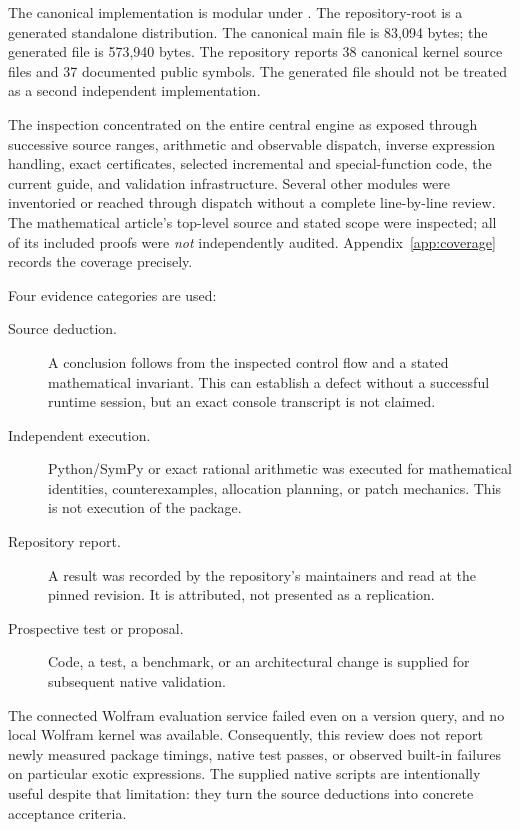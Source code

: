 The canonical implementation is modular under . The repository-root  is a generated standalone distribution. The canonical main file is 83,094 bytes; the generated file is 573,940 bytes. The repository reports 38 canonical kernel source files and 37 documented public symbols. The generated file should not be treated as a second independent implementation.\cite{tree,development,validation}

The inspection concentrated on the entire central engine as exposed through successive source ranges, arithmetic and observable dispatch, inverse expression handling, exact certificates, selected incremental and special-function code, the current guide, and validation infrastructure. Several other modules were inventoried or reached through dispatch without a complete line-by-line review. The mathematical article's top-level source and stated scope were inspected; all of its included proofs were \emph{not} independently audited. Appendix~\ref{app:coverage} records the coverage precisely.

Four evidence categories are used:
\begin{description}
\item[Source deduction.] A conclusion follows from the inspected control flow and a stated mathematical invariant. This can establish a defect without a successful runtime session, but an exact console transcript is not claimed.
\item[Independent execution.] Python/SymPy or exact rational arithmetic was executed for mathematical identities, counterexamples, allocation planning, or patch mechanics. This is not execution of the package.
\item[Repository report.] A result was recorded by the repository's maintainers and read at the pinned revision. It is attributed, not presented as a replication.
\item[Prospective test or proposal.] Code, a test, a benchmark, or an architectural change is supplied for subsequent native validation.
\end{description}

The connected Wolfram evaluation service failed even on a version query, and no local Wolfram kernel was available. Consequently, this review does not report newly measured package timings, native test passes, or observed built-in failures on particular exotic expressions. The supplied native scripts are intentionally useful despite that limitation: they turn the source deductions into concrete acceptance criteria.

